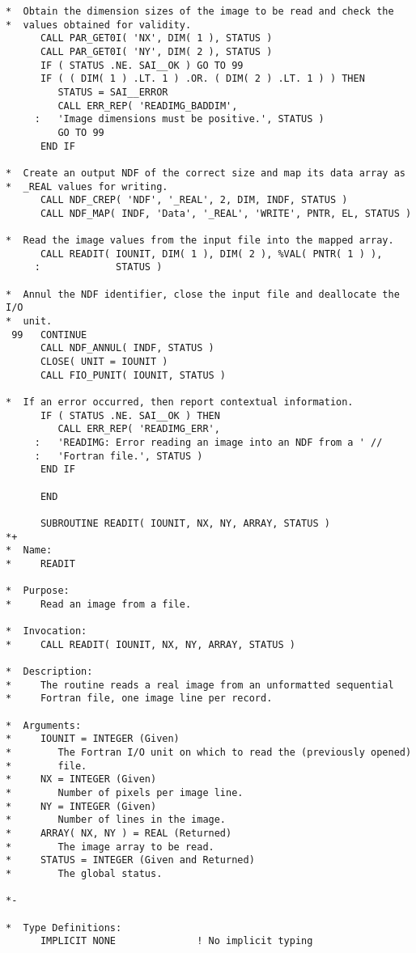 \begin{verbatim}
*  Obtain the dimension sizes of the image to be read and check the
*  values obtained for validity.
      CALL PAR_GET0I( 'NX', DIM( 1 ), STATUS )
      CALL PAR_GET0I( 'NY', DIM( 2 ), STATUS )
      IF ( STATUS .NE. SAI__OK ) GO TO 99
      IF ( ( DIM( 1 ) .LT. 1 ) .OR. ( DIM( 2 ) .LT. 1 ) ) THEN
         STATUS = SAI__ERROR
         CALL ERR_REP( 'READIMG_BADDIM',
     :   'Image dimensions must be positive.', STATUS )
         GO TO 99
      END IF

*  Create an output NDF of the correct size and map its data array as
*  _REAL values for writing.
      CALL NDF_CREP( 'NDF', '_REAL', 2, DIM, INDF, STATUS )
      CALL NDF_MAP( INDF, 'Data', '_REAL', 'WRITE', PNTR, EL, STATUS )

*  Read the image values from the input file into the mapped array.
      CALL READIT( IOUNIT, DIM( 1 ), DIM( 2 ), %VAL( PNTR( 1 ) ),
     :             STATUS )

*  Annul the NDF identifier, close the input file and deallocate the I/O
*  unit.
 99   CONTINUE     
      CALL NDF_ANNUL( INDF, STATUS )
      CLOSE( UNIT = IOUNIT )
      CALL FIO_PUNIT( IOUNIT, STATUS )

*  If an error occurred, then report contextual information.
      IF ( STATUS .NE. SAI__OK ) THEN
         CALL ERR_REP( 'READIMG_ERR',
     :   'READIMG: Error reading an image into an NDF from a ' //
     :   'Fortran file.', STATUS )
      END IF      

      END

      SUBROUTINE READIT( IOUNIT, NX, NY, ARRAY, STATUS )
*+
*  Name:
*     READIT

*  Purpose:
*     Read an image from a file.

*  Invocation:
*     CALL READIT( IOUNIT, NX, NY, ARRAY, STATUS )

*  Description:
*     The routine reads a real image from an unformatted sequential
*     Fortran file, one image line per record.

*  Arguments:
*     IOUNIT = INTEGER (Given)
*        The Fortran I/O unit on which to read the (previously opened)
*        file.
*     NX = INTEGER (Given)
*        Number of pixels per image line.
*     NY = INTEGER (Given)
*        Number of lines in the image.
*     ARRAY( NX, NY ) = REAL (Returned)
*        The image array to be read.
*     STATUS = INTEGER (Given and Returned)
*        The global status.

*-
      
*  Type Definitions:
      IMPLICIT NONE              ! No implicit typing


\end{verbatim}
